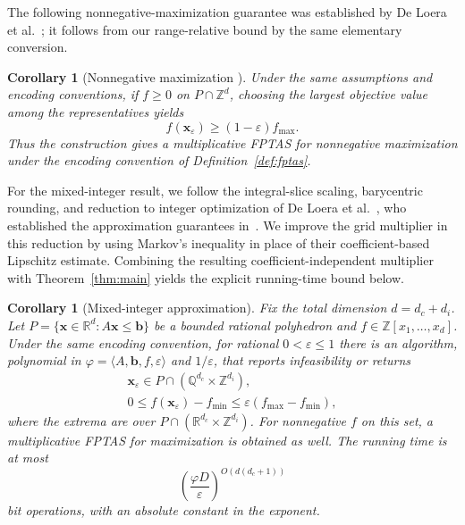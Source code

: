 \documentclass[final,5p,times,twocolumn]{elsarticle}
\newtheorem{corollary}[theorem]{Corollary}
\theoremstyle{definition}\newtheorem{definition}{Definition}[section]
\theoremstyle{remark}\newtheorem{remark}[theorem]{Remark}
\newcommand{\R}{\mathbb R}\newcommand{\Q}{\mathbb Q}\newcommand{\Z}{\mathbb Z}
\newcommand{\eps}{\varepsilon}
\begin{document}
The following nonnegative-maximization guarantee was established by De Loera et al.~\cite[Theorem~1.1]{DHKW06}; it follows from our range-relative bound by the same elementary conversion.

\begin{corollary}[Nonnegative maximization {\cite[Theorem~1.1]{DHKW06}}]\label{cor:max}
Under the same assumptions and encoding conventions, if $f\ge0$ on $P\cap\Z^d$, choosing the largest objective value among the representatives yields
\[
 f(\mathbf{x}_{\eps})\ge(1-\eps)f_{\max}.
\]
Thus the construction gives a multiplicative FPTAS for nonnegative maximization under the encoding convention of Definition~\ref{def:fptas}.
\end{corollary}

For the mixed-integer result, we follow the integral-slice scaling, barycentric rounding, and reduction to integer optimization of De Loera et al.~\cite[Section~3]{DHKW08}, who established the approximation guarantees in~\cite[Theorems~1(a) and~2(b)]{DHKW08}. We improve the grid multiplier in this reduction by using Markov's inequality in place of their coefficient-based Lipschitz estimate. Combining the resulting coefficient-independent multiplier with Theorem~\ref{thm:main} yields the explicit running-time bound below.

\begin{corollary}[Mixed-integer approximation]\label{cor:mixed}
Fix the total dimension $d=d_c+d_i$. Let $P=\{\mathbf{x}\in\R^d:A\mathbf{x}\le\mathbf b\}$ be a bounded rational polyhedron and $f\in\Z[x_1,\ldots,x_d]$. Under the same encoding convention, for rational $0<\eps\le1$ there is an algorithm, polynomial in $\varphi=\langle A,\mathbf b,f,\eps\rangle$ and $1/\eps$, that reports infeasibility or returns
\[
\begin{gathered}\mathbf{x}_{\eps}\in P\cap(\Q^{d_c}\times\Z^{d_i}),\\
 0\le f(\mathbf{x}_{\eps})-f_{\min}\le\eps(f_{\max}-f_{\min}),
\end{gathered}\]
where the extrema are over $P\cap(\R^{d_c}\times\Z^{d_i})$. For nonnegative $f$ on this set, a multiplicative FPTAS for maximization is obtained as well. The running time is at most
\begin{equation}\label{eq:mixed-runtime}
 \left(\frac{\varphi D}{\eps}\right)^{O(d(d_c+1))}
\end{equation}
bit operations, with an absolute constant in the exponent.
\end{corollary}
\end{document}
